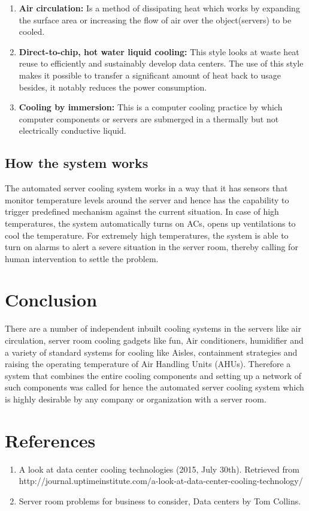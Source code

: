 \documentclass[12pt]{report}
\begin{document}
\begin{enumerate}
 \item  \textbf{Air circulation:} Is a method of dissipating heat which works by expanding the surface area or increasing the flow of air over the object(servers) to be cooled.
\item \textbf{Direct-to-chip, hot water liquid cooling:} This style looks at waste heat reuse to efficiently and sustainably develop data centers. The use of this style makes it possible to transfer a significant amount of heat back to usage besides, it notably reduces the power consumption.
\item \textbf{Cooling by immersion:} This is a computer cooling practice by which computer components or servers are submerged in a thermally but not electrically conductive liquid.
\end{enumerate}

\subsection{How the system works}
The automated server cooling system works in a way that it has sensors that monitor temperature levels around the server and hence has the capability to trigger predefined mechanism against the current situation. In case of high temperatures, the system automatically turns on ACs, opens up ventilations to cool the temperature. For extremely high temperatures, the system is able to turn on alarms to alert a severe situation in the server room, thereby calling for human intervention to settle the problem.

\section{Conclusion}
There are a number of independent inbuilt cooling systems in the servers like air circulation, server room cooling gadgets like fun, Air conditioners, humidifier and a variety of standard systems for cooling like Aisles, containment strategies and raising the operating temperature of Air Handling Units (AHUs). Therefore a system that combines the entire cooling components and setting up a network of such components was called for hence the automated server cooling system which is highly desirable by any company or organization with a server room.

\section{References}
\begin{enumerate}
\item A look at data center cooling technologies (2015, July 30th). Retrieved from http://journal.uptimeinstitute.com/a-look-at-data-center-cooling-technology/
\item Server room problems for business to consider, Data centers by Tom Collins.
\end{enumerate}
\end{document}
